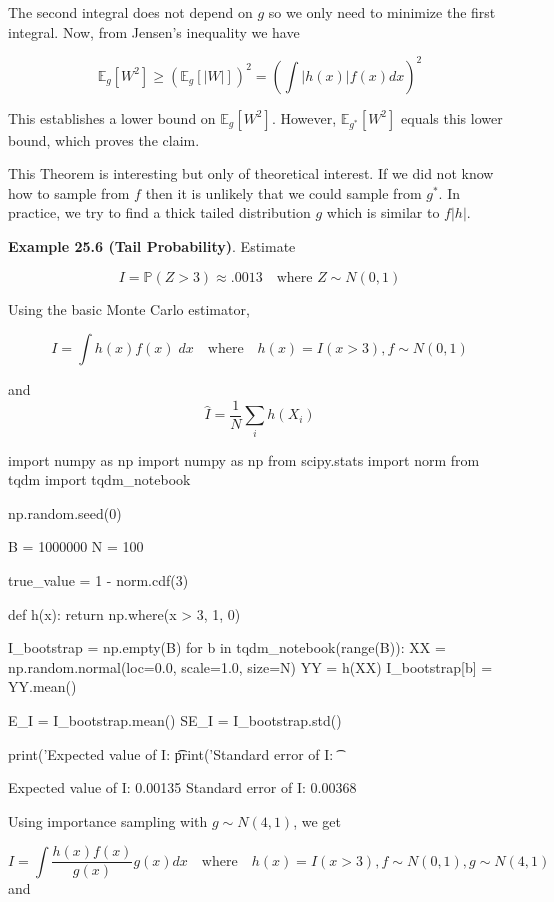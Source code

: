 The second integral does not depend on \(g\) so we only need to minimize
the first integral. Now, from Jensen's inequality we have

\[ \mathbb{E}_g[W^{2}] \geq \left(\mathbb{E}_g[|W|]\right)^{2} = \left( \int |h(x)| f(x) dx \right)^{2} \]

This establishes a lower bound on \(\mathbb{E}_g[W^{2}]\). However,
\(\mathbb{E}_{g^*}[W^{2}]\) equals this lower bound, which proves the
claim.

This Theorem is interesting but only of theoretical interest. If we did
not know how to sample from \(f\) then it is unlikely that we could
sample from \(g^*\). In practice, we try to find a thick tailed
distribution \(g\) which is similar to \(f |h|\).

\textbf{Example 25.6 (Tail Probability)}. Estimate

\[ I = \mathbb{P}(Z > 3) \approx .0013
\quad \text{where } Z \sim N(0, 1)\]

Using the basic Monte Carlo estimator,

\[ I = \int h(x) f(x) \; dx \quad \text{where} \quad h(x) = I(x > 3), f \sim N(0, 1)\]

and \[ \hat{I} = \frac{1}{N} \sum_{i} h(X_{i}) \]

\begin{python}
import numpy as np
import numpy as np
from scipy.stats import norm
from tqdm import tqdm_{n}otebook

np.random.seed(0)

B = 1000000
N = 100

true_value = 1 - norm.cdf(3)

def h(x):
    return np.where(x > 3, 1, 0)

I_bootstrap = np.empty(B)
for b in tqdm_{n}otebook(range(B)):
    XX = np.random.normal(loc=0.0, scale=1.0, size=N)
    YY = h(XX)
    I_bootstrap[b] = YY.mean()

E_I = I_bootstrap.mean()
SE_I = I_bootstrap.std()

print('Expected value of I: \t %
print('Standard error of I: \t %
\end{python}

\begin{console}
Expected value of I:     0.00135
Standard error of I:     0.00368
    \end{console}

Using importance sampling with \(g \sim N(4, 1)\), we get

\[ I = \int \frac{h(x) f(x)}{g(x)} g(x) dx
\quad \text{where} \quad h(x) = I(x > 3), f \sim N(0, 1), g \sim N(4, 1)\]
and

